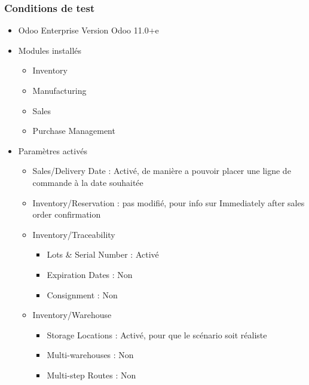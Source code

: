 \documentclass[letterpaper,10pt,french]{sphinxmanual}
\begin{document}
\subsubsection{Conditions de test}
\label{\detokenize{readthedocs/tests/A1_MTS:conditions-de-test}}\begin{itemize}
\item {} 
Odoo Enterprise Version Odoo 11.0+e

\item {} 
Modules installés
\begin{itemize}
\item {} 
Inventory

\item {} 
Manufacturing

\item {} 
Sales

\item {} 
Purchase Management

\end{itemize}

\item {} 
Paramètres activés
\begin{itemize}
\item {} 
Sales/Delivery Date : Activé, de manière a pouvoir placer une ligne de commande à la date souhaitée

\item {} 
Inventory/Reservation : pas modifié, pour info sur Immediately after sales order confirmation

\item {} 
Inventory/Traceability
\begin{itemize}
\item {} 
Lots \& Serial Number : Activé

\item {} 
Expiration Dates : Non

\item {} 
Consignment : Non

\end{itemize}

\item {} 
Inventory/Warehouse
\begin{itemize}
\item {} 
Storage Locations : Activé, pour que le scénario soit réaliste

\item {} 
Multi-warehouses : Non

\item {} 
Multi-step Routes : Non


\end{itemize}
\end{itemize}
\end{itemize}
\end{document}
